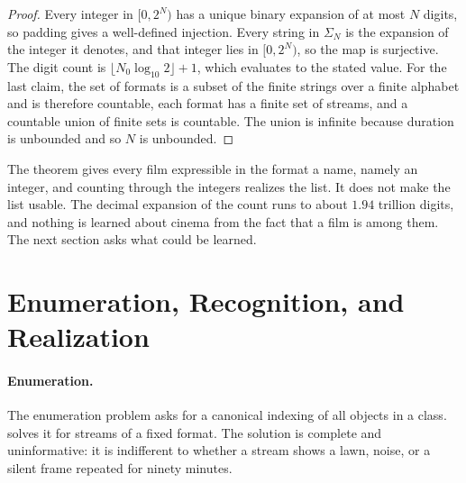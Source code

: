 \documentclass[11pt,twoside,openright]{book}
\theoremstyle{plain}
\theoremstyle{definition}
\theoremstyle{remark}
\begin{document}
\begin{proof}
Every integer in $[0,2^N)$ has a unique binary expansion of at most $N$ digits, so padding gives a well-defined injection. Every string in $\Sigma_N$ is the expansion of the integer it denotes, and that integer lies in $[0,2^N)$, so the map is surjective. The digit count is $\lfloor N_0\log_{10}2\rfloor+1$, which evaluates to the stated value. For the last claim, the set of formats is a subset of the finite strings over a finite alphabet and is therefore countable, each format has a finite set of streams, and a countable union of finite sets is countable. The union is infinite because duration is unbounded and so $N$ is unbounded.
\end{proof}

The theorem gives every film expressible in the format a name, namely an integer, and counting through the integers realizes the list. It does not make the list usable. The decimal expansion of the count runs to about $1.94$ trillion digits, and nothing is learned about cinema from the fact that a film is among them. The next section asks what could be learned.

\section{Enumeration, Recognition, and Realization}\label{sec:three}

\paragraph{Enumeration.} The enumeration problem asks for a canonical indexing of all objects in a class.  solves it for streams of a fixed format. The solution is complete and uninformative: it is indifferent to whether a stream shows a lawn, noise, or a silent frame repeated for ninety minutes.
\end{document}
